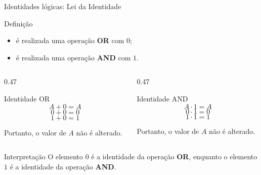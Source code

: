 
\begin{frame}{Identidades lógicas: Lei da Identidade}
    \begin{block}{Definição}
        \begin{itemize}
            \item é realizada uma operação \textbf{OR} com $0$;
            \item é realizada uma operação \textbf{AND} com $1$.
        \end{itemize}
    \end{block}

    \vspace{0.1cm}

    \begin{columns}[T]

        \begin{column}{0.47\textwidth}
            \begin{block}{Identidade OR}
                \[
                    \boxed{A + 0 = A}
                \]
                \[
                    0 + 0 = 0
                \]
                \[
                    1 + 0 = 1
                \]

                Portanto, o valor de $A$ não é alterado.
            \end{block}
        \end{column}

        \begin{column}{0.47\textwidth}
            \begin{block}{Identidade AND}
                \[
                    \boxed{A \cdot 1 = A}
                \]
                \[
                    0 \cdot 1 = 0
                \]
                \[
                    1 \cdot 1 = 1
                \]

                Portanto, o valor de $A$ não é alterado.
            \end{block}
        \end{column}

    \end{columns}

    \begin{alertblock}{Interpretação}
        O elemento $0$ é a identidade da operação \textbf{OR}, enquanto
        o elemento $1$ é a identidade da operação \textbf{AND}.
    \end{alertblock}

    
\end{frame}